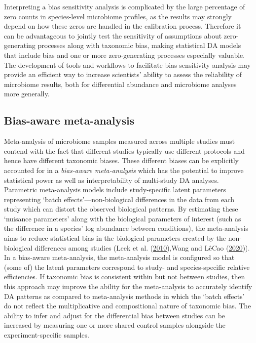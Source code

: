 \documentclass[
]{article}
\begin{document}
Interpreting a bias sensitivity analysis is complicated by the large percentage of zero counts in species-level microbiome profiles, as the results may strongly depend on how these zeros are handled in the calibration process.
Therefore it can be advantageous to jointly test the sensitivity of assumptions about zero-generating processes along with taxonomic bias, making statistical DA models that include bias and one or more zero-generating processes especially valuable.
The development of tools and workflows to facilitate bias sensitivity analysis may provide an efficient way to increase scientists' ability to assess the reliability of microbiome results, both for differential abundance and microbiome analyses more generally.

\hypertarget{bias-aware-meta-analysis}{%
\subsection{Bias-aware meta-analysis}\label{bias-aware-meta-analysis}}

Meta-analysis of microbiome samples measured across multiple studies must contend with the fact that different studies typically use different protocols and hence have different taxonomic biases.
These different biases can be explicitly accounted for in a \emph{bias-aware meta-analysis} which has the potential to improve statistical power as well as interpretability of multi-study DA analyses.
Parametric meta-analysis models include study-specific latent parameters representing `batch effects'---non-biological differences in the data from each study which can distort the observed biological patterns.
By estimating these `nuisance parameters' along with the biological parameters of interest (such as the difference in a species' log abundance between conditions), the meta-analysis aims to reduce statistical bias in the biological parameters created by the non-biological differences among studies (Leek et al. (\protect\hyperlink{ref-leek2010tack}{2010}),Wang and LêCao (\protect\hyperlink{ref-wang2019mana}{2020})).
In a bias-aware meta-analysis, the meta-analysis model is configured so that (some of) the latent parameters correspond to study- and species-specific relative efficiencies.
If taxonomic bias is consistent within but not between studies, then this approach may improve the ability for the meta-analysis to accurately identify DA patterns as compared to meta-analysis methods in which the `batch effects' do not reflect the multiplicative and compositional nature of taxonomic bias.
The ability to infer and adjust for the differential bias between studies can be increased by measuring one or more shared control samples alongside the experiment-specific samples.
\end{document}
